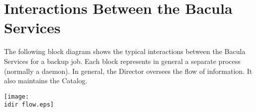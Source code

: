 \section{Interactions Between the Bacula Services}

The following block diagram shows the typical interactions between the Bacula
Services for a backup job. Each block represents in general a separate process
(normally a daemon). In general, the Director oversees the flow of
information. It also maintains the Catalog. 

\texttt{[image: \\idir flow.eps]} 
